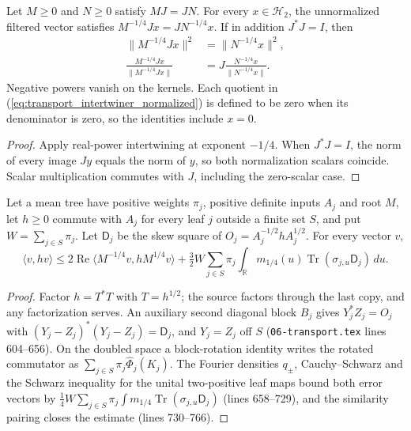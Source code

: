 \begin{theorem}
\label{thm:transport_intertwiner_filtering}
\leanok
{}
Let $M\ge0$ and $N\ge0$ satisfy $MJ=JN$. For every
$x\in\mathcal H_2$, the unnormalized filtered vector satisfies
$M^{-1/4}Jx=JN^{-1/4}x$. If in addition $J^*J=I$, then
\begin{align}
 \|M^{-1/4}Jx\|^2&=\|N^{-1/4}x\|^2,
 \label{eq:transport_intertwiner_norm}\\
 \frac{M^{-1/4}Jx}{\|M^{-1/4}Jx\|}
   &=J\frac{N^{-1/4}x}{\|N^{-1/4}x\|}.
 \label{eq:transport_intertwiner_normalized}
\end{align}
Negative powers vanish on the kernels. Each quotient in
(\ref{eq:transport_intertwiner_normalized}) is defined to be zero when its
denominator is zero, so the identities include $x=0$.
\end{theorem}
\begin{proof}\leanok
{}
Apply real-power intertwining at exponent $-1/4$. When $J^*J=I$, the norm
of every image $Jy$ equals the norm of $y$, so both normalization scalars
coincide. Scalar multiplication commutes with $J$, including the zero-scalar
case.
\end{proof}

\begin{lemma}\label{lem:transport_energy_block}
    \leanok
    Let a mean tree have positive weights $\pi_j$, positive definite inputs $A_j$
    and root $M$, let $h\ge0$ commute with $A_j$ for every leaf $j$ outside a finite
    set $S$, and put $W=\sum_{j\in S}\pi_j$. Let $\mathsf D_j$ be the skew square of
    $O_j=A_j^{-1/2}hA_j^{1/2}$. For every vector $v$,
    \[
      \langle v,hv\rangle\le2\operatorname{Re}\langle M^{-1/4}v,hM^{1/4}v\rangle
      +\tfrac32W\sum_{j\in S}\pi_j\int_{\mathbb R}m_{1/4}(u)
      \operatorname{Tr}(\sigma_{j,u}\mathsf D_j)\,du .
    \]
\end{lemma}

\begin{proof}\leanok
    Factor $h=T^*T$ with $T=h^{1/2}$; the source factors through the last copy,
    and any factorization serves. An auxiliary second diagonal block $B_j$ gives
    $Y_j^*Z_j=O_j$ with $(Y_j-Z_j)^*(Y_j-Z_j)=\mathsf D_j$, and $Y_j=Z_j$ off $S$
    (\texttt{06-transport.tex} lines 604--656). On the doubled space a
    block-rotation identity writes the rotated commutator as
    $\sum_{j\in S}\pi_j\widehat\Phi_j(K_j)$. The Fourier densities $q_\pm$,
    Cauchy--Schwarz and the Schwarz inequality for the unital two-positive leaf
    maps bound both error vectors by $\tfrac14W\sum_{j\in S}\pi_j\int
    m_{1/4}\operatorname{Tr}(\sigma_{j,u}\mathsf D_j)$ (lines 658--729), and the
    similarity pairing closes the estimate (lines 730--766).
\end{proof}

